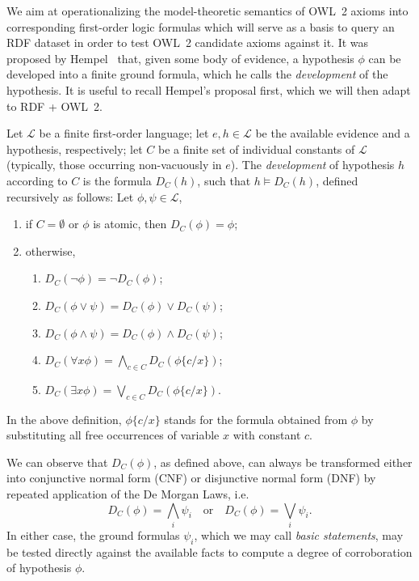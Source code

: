 \documentclass[review]{elsarticle}
\theoremstyle{definition}
\begin{document}
We aim at operationalizing the model-theoretic semantics of OWL~2 axioms into corresponding first-order logic formulas which will serve as a basis to query an RDF dataset in order to test OWL~2 candidate axioms against it. 
It was proposed by Hempel~\cite{Hempel1943}
that, given some body of evidence,
a hypothesis $\phi$ can be developed into a finite ground formula, which he
calls the \emph{development} of the hypothesis.
It is useful to recall Hempel's proposal first, which we will then adapt
to RDF + OWL~2.

Let $\mathcal{L}$ be a finite first-order language;
let $e, h\in\mathcal{L}$ be the available evidence and a hypothesis, respectively; let $C$ be a finite set of individual constants of $\mathcal{L}$
(typically, those occurring non-vacuously in $e$).
The \emph{development} of hypothesis $h$ according to $C$ is the formula $D_C(h)$,
such that $h \models D_C(h)$,
defined recursively as follows: Let $\phi, \psi\in\mathcal{L}$,
\begin{enumerate}
\item if $C = \emptyset$ or $\phi$ is atomic, then $D_C(\phi) = \phi$;
\item otherwise,
  \begin{enumerate}
  \item $D_C(\neg\phi) = \neg D_C(\phi)$;
  \item $D_C(\phi \lor \psi) = D_C(\phi) \lor D_C(\psi)$;
  \item $D_C(\phi \land \psi) = D_C(\phi) \land D_C(\psi)$;
  \item $D_C(\forall x\phi) = \bigwedge_{c\in C}D_C(\phi\{c/x\})$;
  \item $D_C(\exists x\phi) = \bigvee_{c\in C}D_C(\phi\{c/x\})$.
  \end{enumerate}
\end{enumerate}
In the above definition, $\phi\{c/x\}$ stands for the formula obtained
from $\phi$ by substituting all free occurrences of variable $x$ with constant $c$.

We can observe that $D_C(\phi)$, as defined above, can always be transformed
either into conjunctive normal form (CNF) or disjunctive normal form (DNF) by repeated
application of the De Morgan Laws, i.e.
\begin{equation}
  D_C(\phi) = \bigwedge_i \psi_i
  \quad\mbox{or}\quad
  D_C(\phi) = \bigvee_i \psi_i.
\end{equation}
In either case, the ground formulas $\psi_i$, which we may call
\emph{basic statements}, may be tested directly against the available facts
to compute a degree of corroboration of hypothesis $\phi$.
\end{document}
